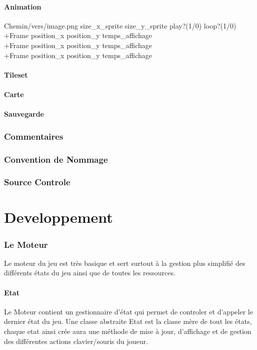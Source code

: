 \documentclass[a4paper]{article}
\begin{document}
		\subsection{Animation} %
			Chemin/vers/image.png size_x_sprite size_y_sprite play?(1/0) loop?(1/0)\\
			+Frame position_x position_y temps_affichage\\
			+Frame position_x position_y temps_affichage\\
			+Frame position_x position_y temps_affichage\\
		\subsection{Tileset}
		\subsection{Carte}
		\subsection{Sauvegarde}
    \section{Commentaires}
    \section{Convention de Nommage}
    \section{Source Controle} %
		
\newpage
  \part{Developpement} %
	\section{Le Moteur}
		Le moteur du jeu est très basique et sert surtout à la gestion plus simplifié des différents états du jeu ainsi que de toutes les ressources.
		\subsection{Etat}
			Le Moteur contient un gestionnaire d'état qui permet de controler et d'appeler le dernier état du jeu. Une classe abstraite Etat est la classe mère de tout les états, chaque etat ainsi crée aura une méthode de mise à jour, d'affichage et de gestion des différentes actions clavier/souris du joueur.
\end{document}
